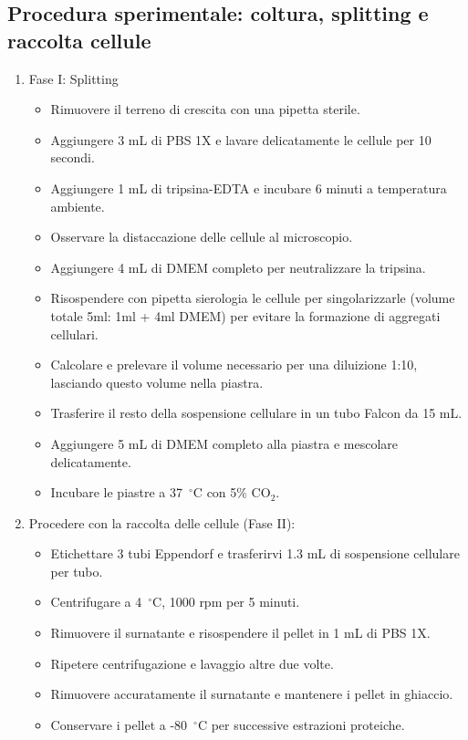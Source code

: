 \subsection{Procedura sperimentale: coltura, splitting e raccolta cellule}
\begin{enumerate}\footnotesize
  \item Fase I: Splitting
  \begin{itemize}
    \item Rimuovere il terreno di crescita con una pipetta sterile.
    \item Aggiungere 3 mL di PBS 1X e lavare delicatamente le cellule per 10 secondi.
    \item Aggiungere 1 mL di tripsina-EDTA e incubare 6 minuti a temperatura ambiente.
    \item Osservare la distaccazione delle cellule al microscopio.
    \item Aggiungere 4 mL di DMEM completo per neutralizzare la tripsina.
    \item Risospendere con pipetta sierologia le cellule per singolarizzarle (volume totale 5ml: 1ml + 4ml DMEM) per evitare la formazione di aggregati cellulari.
    \item Calcolare e prelevare il volume necessario per una diluizione 1:10, lasciando questo volume nella piastra.
    \item Trasferire il resto della sospensione cellulare in un tubo Falcon da 15 mL.
    \item Aggiungere 5 mL di DMEM completo alla piastra e mescolare delicatamente.
    \item Incubare le piastre a 37~$^\circ$C con 5\% CO$_2$.
  \end{itemize}
  \item Procedere con la raccolta delle cellule (Fase II):
  \begin{itemize}
    \item Etichettare 3 tubi Eppendorf e trasferirvi 1.3 mL di sospensione cellulare per tubo.
    \item Centrifugare a 4~$^\circ$C, 1000 rpm per 5 minuti.
    \item Rimuovere il surnatante e risospendere il pellet in 1 mL di PBS 1X.
    \item Ripetere centrifugazione e lavaggio altre due volte.
    \item Rimuovere accuratamente il surnatante e mantenere i pellet in ghiaccio.
    \item Conservare i pellet a -80~$^\circ$C per successive estrazioni proteiche.
  \end{itemize}
\end{enumerate}

